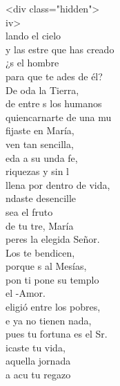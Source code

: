 \documentclass[12pt]{article}
\begin{document}
\begin{multicols*}{2}
\begin{cancion}%
<div class="hidden">\\
	iv>\\
	lando el cielo \\
	y las estre que has creado\\
	¿s el hombre  \\
	para que te ades de él?\\
	De oda la Tierra, \\
	de entre s los humanos\\
	quiencarnarte de una mu\\
	fijaste en María, \\
	ven tan sencilla,\\
	eda a su unda fe,\\
	 riquezas y sin l\\
llena por dentro de vida,\\
	ndaste desencille  \\
\jump
	 sea el fruto \\
	de tu tre, María\\
	peres la elegida Señor.\\
	Los  te bendicen, \\
	porque s al Mesías,\\
	pon ti pone su templo \\
	el -Amor.\\
	eligió entre los pobres, \\
	e ya no tienen nada,\\
	pues tu  fortuna es el Sr.\\
	icaste tu vida, \\
	aquella jornada\\
	a acu tu regazo \\

\end{cancion}
\end{multicols*}
\end{document}
